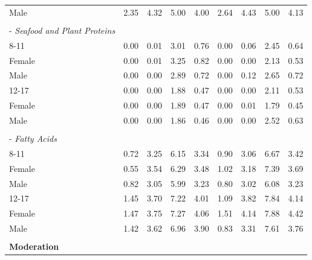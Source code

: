 \documentclass[12pt,leqno,titlepage]{amsart}
\newcommand{\1}{\mathbbm{1}}
\begin{document}
\begin{bibunit}
\begin{longtable}{@{\extracolsep{\fill}}lcccc|cccc@{}}
\hspace*{4.4em}Male & 2.35 & 4.32 & 5.00 & 4.00 & 2.64 & 4.43 & 5.00 & 4.13 \\
\rule{0pt}{1.1em} & & & & & & & & \\
\hspace*{0.8em}- \textit{Seafood and Plant Proteins} & & & & & & & & \\
\hspace*{2.2em}8-11 & 0.00 & 0.01 & 3.01 & 0.76 & 0.00 & 0.06 & 2.45 & 0.64 \\
\hspace*{4.4em}Female & 0.00 & 0.01 & 3.25 & 0.82 & 0.00 & 0.00 & 2.13 & 0.53 \\
\hspace*{4.4em}Male & 0.00 & 0.00 & 2.89 & 0.72 & 0.00 & 0.12 & 2.65 & 0.72 \\
\hspace*{2.2em}12-17 & 0.00 & 0.00 & 1.88 & 0.47 & 0.00 & 0.00 & 2.11 & 0.53 \\
\hspace*{4.4em}Female & 0.00 & 0.00 & 1.89 & 0.47 & 0.00 & 0.01 & 1.79 & 0.45 \\
\hspace*{4.4em}Male & 0.00 & 0.00 & 1.86 & 0.46 & 0.00 & 0.00 & 2.52 & 0.63 \\
\rule{0pt}{1.1em} & & & & & & & & \\
\hspace*{0.8em}- \textit{Fatty Acids} & & & & & & & & \\
\hspace*{2.2em}8-11 & 0.72 & 3.25 & 6.15 & 3.34 & 0.90 & 3.06 & 6.67 & 3.42 \\
\hspace*{4.4em}Female & 0.55 & 3.54 & 6.29 & 3.48 & 1.02 & 3.18 & 7.39 & 3.69 \\
\hspace*{4.4em}Male & 0.82 & 3.05 & 5.99 & 3.23 & 0.80 & 3.02 & 6.08 & 3.23 \\
\hspace*{2.2em}12-17 & 1.45 & 3.70 & 7.22 & 4.01 & 1.09 & 3.82 & 7.84 & 4.14 \\
\hspace*{4.4em}Female & 1.47 & 3.75 & 7.27 & 4.06 & 1.51 & 4.14 & 7.88 & 4.42 \\
\hspace*{4.4em}Male & 1.42 & 3.62 & 6.96 & 3.90 & 0.83 & 3.31 & 7.61 & 3.76 \\
\rule{0pt}{1.1em} & & & & & & & & \\
\hspace*{0.8em}\textbf{Moderation} & & & & & & & & \\

\end{longtable}
\end{bibunit}
\end{document}

